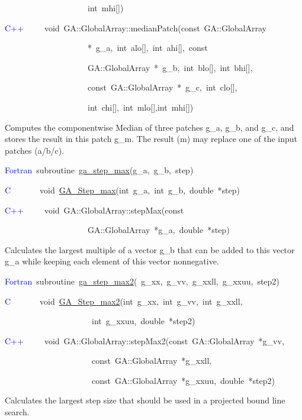 ~~~~~~~~~~~~~~~~~~~~int~mhi{[}{]})~

\textcolor{blue}{C++}~~~~~void~GA::GlobalArray::medianPatch(const~GA::GlobalArray

~~~~~~~~~~~~~~~~~~~~{*}~g\_a,~int~alo{[}{]},~int~ahi{[}{]},~const~

~~~~~~~~~~~~~~~~~~~~GA::GlobalArray~{*}~g\_b,~int~blo{[}{]},~int~bhi{[}{]},~

~~~~~~~~~~~~~~~~~~~~const~GA::GlobalArray~{*}~g\_c,~int~clo{[}{]},~

~~~~~~~~~~~~~~~~~~~~int~chi{[}{]},~int~mlo{[}{]},int~mhi{[}{]})

Computes the componentwise Median of three patches g\_a, g\_b, and
g\_c, and stores the result in this patch g\_m. The result (m) may
replace one of the input patches (a/b/c). 

\textcolor{blue}{Fortran}~subroutine~\href{https://hpc.pnl.gov/globalarrays/api/f_op_api.html\#ga_step_max}{ga\_{}step\_{}max}(g\_a,~g\_b,~step)~

\textcolor{blue}{C}~~~~~~~void~\href{https://hpc.pnl.gov/globalarrays/api/c_op_api.html\#ga_step_max}{GA\_{}Step\_{}max}(int~g\_a,~int~g\_b,~double~{*}step)~

\textcolor{blue}{C++~}~~~~void~GA::GlobalArray::stepMax(const~

~~~~~~~~~~~~~~~~~~~~GA::GlobalArray~{*}g\_a,~double~{*}step)

Calculates the largest multiple of a vector g\_b that can be added
to this vector g\_a while keeping each element of this vector nonnegative. 

\textcolor{blue}{Fortran}~subroutine~\href{https://hpc.pnl.gov/globalarrays/api/f_op_api.html\#ga_step_max2}{ga\_{}step\_{}max2}(~g\_xx,~g\_vv,~g\_xxll,~g\_xxuu,~step2)~

\textcolor{blue}{C}~~~~~~~void~\href{https://hpc.pnl.gov/globalarrays/api/c_op_api.html\#ga_step_max2}{GA\_{}Step\_{}max2}(int~g\_xx,~int~g\_vv,~int~g\_xxll,

~~~~~~~~~~~~~~~~~~~~~int~g\_xxuu,~double~{*}step2)

\textcolor{blue}{C++}~~~~~void~GA::GlobalArray::stepMax2(const~GA::GlobalArray~{*}g\_vv,~

~~~~~~~~~~~~~~~~~~~~~const~GA::GlobalArray~{*}g\_xxll,~

~~~~~~~~~~~~~~~~~~~~~const~GA::GlobalArray~{*}g\_xxuu,~double~{*}step2)

Calculates the largest step size that should be used in a projected
bound line search. 

